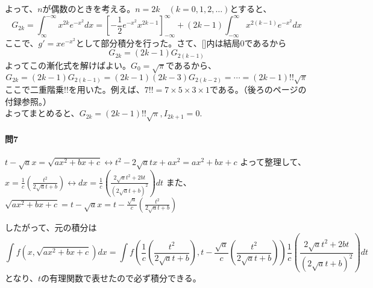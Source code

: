 \documentclass[a4j,dvipdfmx]{jsarticle}
\begin{document}
                        よって、$n$が偶数のときを考える。$n=2k\quad(k=0,1,2,\dots)$とすると、
                        \begin{equation*}
                            G_{2k}=\int_{\infty}^{-\infty}x^{2k}e^{-x^2}dx = \left[-\frac{1}{2}e^{-x^2}x^{2k-1}\right]_{-\infty}^{\infty}+(2k-1)\int_{-\infty}^{\infty}x^{2(k-1)}e^{-x^2}dx
                        \end{equation*}
                        ここで、$g'=xe^{-x^2}$として部分積分を行った。さて、[\hspace{2mm}]内は結局0であるから
                        \begin{equation*}
                            G_{2k}=(2k-1)G_{2(k-1)}
                        \end{equation*}
                        よってこの漸化式を解けばよい。$G_0=\sqrt{\pi}$であるから、
                        \begin{equation*}
                            G_{2k} = (2k-1)G_{2(k-1)}=(2k-1)(2k-3)G_{2(k-2)}=\cdots =(2k-1)!!\sqrt{\pi} 
                        \end{equation*}
                        ここで二重階乗$!!$を用いた。例えば、$7!! = 7\times 5\times 3\times 1$である。（後ろのページの付録参照。）\\よってまとめると、$G_{2k}=(2k-1)!!\sqrt{\pi},I_{2k+1}=0.$

                    \paragraph{問7}
                        $t-\sqrt{a}x=\sqrt{ax^2+bx+c}\leftrightarrow t^2-2\sqrt{a}tx+ax^2 = ax^2+bx+c$
                        よって整理して、$\displaystyle x = \frac{1}{c}\left(\frac{t^2}{2\sqrt{a}t+b}\right)\leftrightarrow dx = \frac{1}{c}\left(\frac{2\sqrt{a}t^2+2bt}{(2\sqrt{a}t+b)^2}\right)dt$
                        また、$\displaystyle\sqrt{ax^2+bx+c} = t-\sqrt{a}x =t-\frac{\sqrt{a}}{c}\left(\frac{t^2}{2\sqrt{a}t+b}\right)$

                        したがって、元の積分は
                        \begin{equation*}
                            \int f(x,\sqrt{ax^2+bx+c})dx = \int f\left(\frac{1}{c}\left(\frac{t^2}{2\sqrt{a}t+b}\right),t-\frac{\sqrt{a}}{c}\left(\frac{t^2}{2\sqrt{a}t+b}\right)\right)\frac{1}{c}\left(\frac{2\sqrt{a}t^2+2bt}{(2\sqrt{a}t+b)^2}\right)dt
                        \end{equation*}
                        となり、$t$の有理関数で表せたので必ず積分できる。
                    
\end{document}
